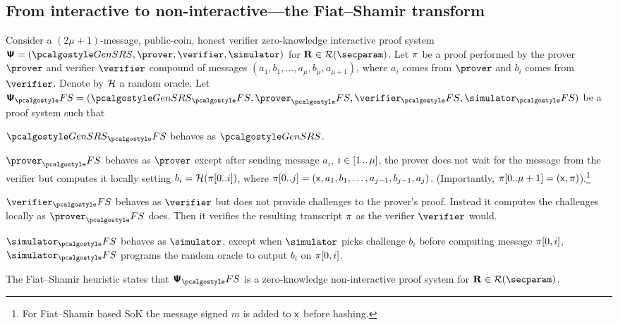 \iffalse
\subsection{From interactive to non-interactive---the Fiat--Shamir transform}
Consider a $(2\mu + 1)$-message, public-coin, honest verifier zero-knowledge
interactive proof system
$\proofsystem = (\kgen, \prover, \verifier, \simulator)$ for
$\REL \in \RELGEN(\secparam)$.  Let $\pi$ be a proof performed by the
prover $\prover$ and verifier $\verifier$ compound of messages
$(a_1, b_1, \ldots, a_{\mu}, b_{\mu}, a_{\mu + 1})$, where $a_i$ comes from
$\prover$ and $b_i$ comes from $\verifier$.  Denote by $\mathcal{H}$ a random oracle.
Let $\proofsystem_\fs = (\kgen_\fs, \prover_\fs, \verifier_\fs, \simulator_\fs)$
be a proof system such that
\begin{compactitem}
  \item $\kgen_\fs$ behaves as $\kgen$.
  \item $\prover_\fs$ behaves as $\prover$ except after sending message
    $a_i$, $i \in [1 \, .. \, \mu]$, the prover does not wait for
    the message from the verifier but computes it locally setting $b_i
    = \mathcal{H}(\pi[0..i])$, where $\pi[0..j] = (\mathsf{x}, a_1, b_1, \ldots,
    a_{j - 1}, b_{j - 1}, a_j)$. (Importantly, $\pi[0..\mu + 1] =
    (\mathsf{x}, \pi)$).\footnote{For Fiat--Shamir based SoK the message signed $m$ is added to $\mathsf{x}$ before hashing.}
  \item $\verifier_\fs$ behaves as $\verifier$ but does not provide
    challenges to the prover's proof. Instead it computes the
    challenges locally as $\prover_\fs$ does. Then it verifies the
    resulting transcript $\pi$ as the verifier $\verifier$ would. 
  \item $\simulator_\fs$ behaves as $\simulator$, except when
    $\simulator$ picks challenge $b_i$ before computing message $\pi[0, i]$, $\simulator_\fs$ programs the
    random oracle to output $b_i$ on $\pi[0, i]$.
  \end{compactitem}

\noindent
The Fiat--Shamir heuristic states that $\proofsystem_\fs$ is a zero-knowledge
non-interactive proof system for $\REL \in \RELGEN(\secparam)$.



